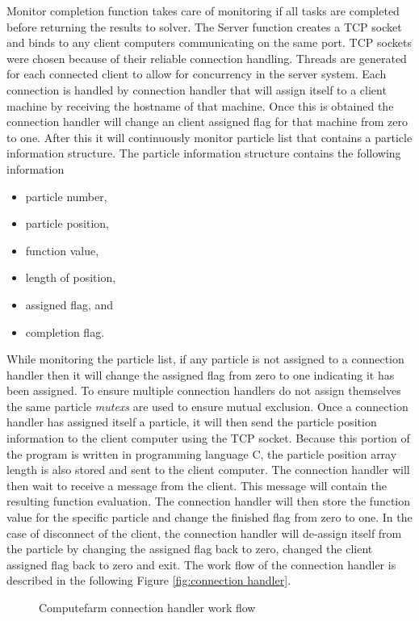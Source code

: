 Monitor completion function takes care of monitoring if all tasks are completed before returning the results to solver. The Server function creates a TCP socket and binds to any client computers communicating on the same port. TCP sockets were chosen because of their reliable connection handling. Threads are generated for each connected client to allow for concurrency in the server system. Each connection is handled by connection handler that will assign itself to a client
machine by receiving the hostname of that machine. Once this is obtained the connection handler will change an client assigned flag for that machine from zero to one. After this it will continuously monitor particle list that contains a particle information structure. The particle information
structure contains the following information 
\begin{itemize}
    \item particle number,
    \item particle position,
    \item function value,
    \item length of position, 
    \item assigned flag, and
    \item completion flag.
\end{itemize}
While monitoring the particle list, if any particle is not assigned to a connection handler then it will change the assigned flag from zero to one indicating it has been assigned. To ensure multiple connection handlers do not assign themselves the same particle \textit{mutexs} are used to ensure mutual exclusion. Once a connection handler has assigned itself a particle, it will then send the particle position information to the client computer using the TCP socket. Because this portion
of the program is written in programming language C, the particle position array length is also stored and sent to the client computer. The connection handler will then wait to receive a message from the client. This message will contain the resulting function evaluation. The connection handler will then store the function value for the specific particle and change the finished flag from zero to one. In the case of disconnect of the client, the connection handler will de-assign itself from
the particle by changing the assigned flag back to zero, changed the client assigned flag back to zero and exit. The work flow of the connection handler is described in the following Figure \ref{fig:connection handler}.

\begin{figure}[!h]
    \centering
    
    \caption{Computefarm connection handler work flow}
    \label{fig:computefarm}
\end{figure}

